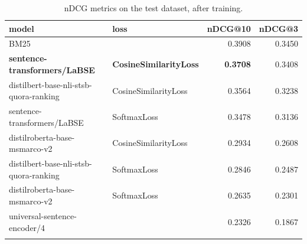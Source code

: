\documentclass{article}
\begin{document}
\begin{table}[hbt!]
\centering
\caption{nDCG metrics on the test dataset, after training.}
\begin{tabular}{llrr}
\toprule
                             model &         loss &  \textbf{nDCG@10} &  nDCG@3 \\
\midrule

                                   BM25 &                       &           0.3908 &          0.3450 \\
            \textbf{sentence-transformers/LaBSE} &  \textbf{CosineSimilarityLoss} &           \textbf{0.3708} &          0.3408 \\
 distilbert-base-nli-stsb-quora-ranking &  CosineSimilarityLoss &           0.3564 &          0.3238 \\
            sentence-transformers/LaBSE &           SoftmaxLoss &           0.3478 &          0.3136 \\
          distilroberta-base-msmarco-v2 &  CosineSimilarityLoss &           0.2934 &          0.2608 \\
 distilbert-base-nli-stsb-quora-ranking &           SoftmaxLoss &           0.2846 &          0.2487 \\
          distilroberta-base-msmarco-v2 &           SoftmaxLoss &           0.2635 &          0.2301 \\
           universal-sentence-encoder/4 &                       &           0.2326 &          0.1867 \\           
           
\bottomrule           
\label{tab:results_ndcg}
\end{tabular}
\end{table}
\end{document}
